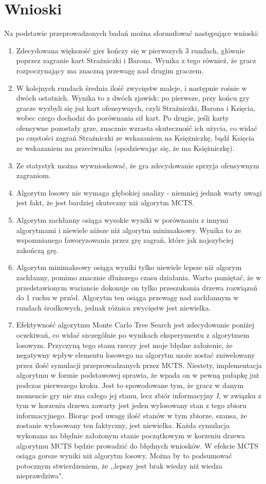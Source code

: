 \section{Wnioski}
Na podstawie przeprowadzonych badań można sformułować następujące wnioski:
\begin{enumerate}
	\item Zdecydowana większość gier kończy się w pierwszych 3 rundach, głównie poprzez zagranie kart Strażniczki i Barona. Wynika z tego również, że gracz rozpoczynający ma znaczną przewagę nad drugim graczem.
	\item W kolejnych rundach średnia ilość zwycięstw maleje, i następnie rośnie w dwóch ostatnich. Wynika to z dwóch zjawisk: po pierwsze, przy końcu gry gracze wyzbyli się już kart ofensywnych, czyli Strażniczki, Barona i Księcia, wobec czego dochodzi do porównania sił kart. Po drugie, jeśli karty ofensywne pozostały grze, znacznie wzrasta skuteczność ich użycia, co widać po częstości zagrań Strażniczki ze wskazaniem na Księżniczkę, bądź Księcia ze wskazaniem na przeciwnika (spodziewając się, że ma Księżniczkę).
	\item Ze statystyk można wywnioskować, że gra zdecydowanie sprzyja ofensywnym zagraniom.
	\item Algorytm losowy nie wymaga głębokiej analizy - niemniej jednak warty uwagi jest fakt, że jest bardziej skuteczny niż algorytm MCTS.
	\item Algorytm zachłanny osiąga wysokie wyniki w porównaniu z innymi algorytmami i niewiele niższe niż algorytm minimaksowy. Wynika to ze wspomnianego faworyzowania przez grę zagrań, które jak najszybciej zakończą grę. 
	\item Algorytm minimaksowy osiąga wyniki tylko niewiele lepsze niż algorym zachłanny, pomimo znacznie dłuższego czasu działania. Warto pamiętać, że w przedstawionym wariancie dokonuje on tylko przeszukania drzewa rozwiązań do 1 ruchu w przód. Algorytm ten osiąga przewagę nad zachłannym w rundach środkowych, jednak różnica zwycięstw jest niewielka.
	\item Efektywność algorytmu Monte Carlo Tree Search jest zdecydowanie poniżej oczekiwań, co widać szczególnie po wynikach eksperymentu z algorytmem losowym. Przyczyną tego stanu rzeczy jest moje błędne założenie, że negatywny wpływ elementu losowego na algorytm może zostać zniwelowany przez ilość symulacji przeprowadzanych przez MCTS. Niestety, implementacja algorytmu w formie podstawowej sprawia, że wpada on w pewną pułapkę już podczas pierwszego kroku. Jest to spowodowane tym, że gracz w danym momencie gry nie zna całego jej stanu, lecz zbiór informacyjny \textit{I}, w związku z tym w korzeniu drzewa zawarty jest jeden wylosowany stan z tego zbioru informacyjnego. Biorąc pod uwagę ilość stanów w tym zbiorze, szansa, że zostanie wylosowany ten faktyczny, jest niewielka. Każda symulacja wykonana na błędnie założonym stanie początkowym w korzeniu drzewa algorytmu MCTS będzie prowadzić do błędnych wniosków. W efekcie MCTS osiąga gorsze wyniki niż algorytm losowy. Można by to podsumować potocznym stwierdzeniem, że ,,lepszy jest brak wiedzy niż wiedza nieprawdziwa".
\end{enumerate}
